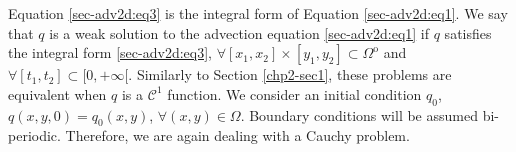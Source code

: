 Equation \eqref{sec-adv2d:eq3} is the integral form of Equation 
\eqref{sec-adv2d:eq1}. We say that ${q}$ is a weak
solution to the advection equation \eqref{sec-adv2d:eq1} if ${q}$
satisfies the integral form \eqref{sec-adv2d:eq3}, 
$\forall [x_1,x_2]\times[y_1,y_2] \subset \Omega^{\mathrm{o}}$ and 
$\forall [t_1,t_2] \subset [0,+\infty[$.
Similarly to Section \ref{chp2-sec1}, these problems are equivalent
when  ${q}$ is a $\mathcal{C}^1$ function.
We consider an initial condition ${q_0}$,
${q}(x,y,0) =  {q_0}(x,y)$, $\forall (x,y) \in \Omega$.
Boundary conditions will be assumed bi-periodic.
Therefore, we are again dealing with a Cauchy problem. 

